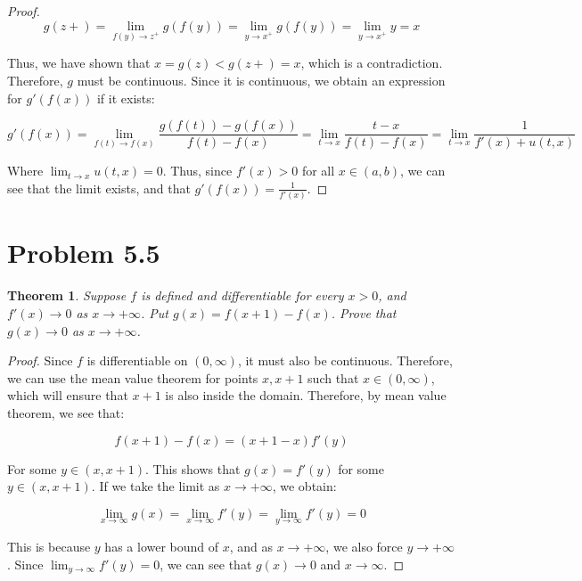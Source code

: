 \documentclass[psamsfonts]{amsart}
\newtheorem{thm}{Theorem}[section]
\theoremstyle{definition}
\theoremstyle{remark}
\numberwithin{equation}{section}
\begin{document}
\begin{proof}
\begin{equation}
g(z+) = \lim_{f(y) \to z^{+}} g(f(y)) = \lim_{y \to x^{+} } g(f(y)) = \lim_{y \to x^{+}} y = x
\end{equation}

Thus, we have shown that $x = g(z) < g(z+) = x$, which is a contradiction. Therefore, $g$ must be continuous. Since it is continuous, we obtain an expression for $g'(f(x))$ if it exists:

\begin{equation}
g'(f(x)) = \lim_{f(t) \to f(x)} \frac{g(f(t)) - g(f(x))}{f(t) - f(x)} = \lim_{t \to x} \frac{t - x}{f(t) - f(x)} = \lim_{t \to x} \frac{1}{f'(x) + u(t,x)}
\end{equation}

Where $\lim_{t \to x} u(t,x) = 0$. Thus, since $f'(x) >0$ for all $x \in (a,b)$, we can see that the limit exists, and that $g'(f(x)) = \frac{1}{f'(x)}$. 
\end{proof}

\section{Problem 5.5}

\begin{thm}
Suppose $f$ is defined and differentiable for every $x > 0$, and $f'(x) \rightarrow 0$ as $x \rightarrow + \infty$. Put $g(x) = f(x + 1) - f(x)$. Prove that $g(x) \rightarrow 0$ as $x \rightarrow + \infty$. 
\end{thm}

\begin{proof}
Since $f$ is differentiable on $(0,\infty)$, it must also be continuous. Therefore, we can use the mean value theorem for points $x, x+1$ such that $x \in (0,\infty)$, which will ensure that $x+1$ is also inside the domain. Therefore, by mean value theorem, we see that:

\begin{equation}
f(x+1) - f(x) = (x + 1 - x) f'(y)
\end{equation}

For some $y \in (x, x+1)$. This shows that $g(x) = f'(y)$ for some $y \in (x,x+1)$. If we take the limit as $x \rightarrow + \infty$, we obtain:

\begin{equation}
\lim_{x \to \infty} g(x) = \lim_{x \to \infty} f'(y) = \lim_{y \to \infty} f'(y) = 0
\end{equation}

This is because $y$ has a lower bound of $x$, and as $x \rightarrow + \infty$, we also force $y \rightarrow +\infty$. Since $\lim_{y \to \infty} f'(y) = 0$, we can see that $g(x) \rightarrow 0$ and $x \to \infty$. 
\end{proof}
\end{document}
